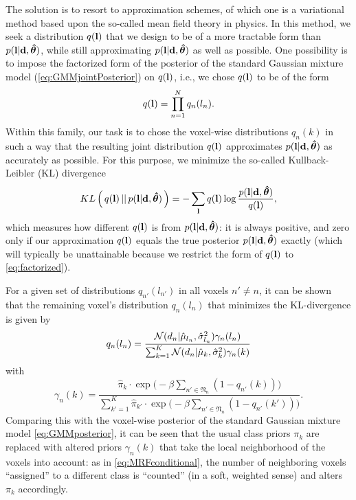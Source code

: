 \documentclass[10pt,twoside]{book}
\begin{document}
The solution is to resort to approximation schemes, of which one is a variational method based upon the so-called mean field theory in physics. In this method, we seek a distribution $q(\mathbf{l})$ that we design to be of a more tractable form than $p(\mathbf{l} | \mathbf{d}, {\mbox{\boldmath {${\hat{\theta}}$}}})$, while still approximating $p(\mathbf{l} | \mathbf{d}, {\mbox{\boldmath {${\hat{\theta}}$}}})$ as well as possible. One possibility is to impose the factorized form of the posterior of the standard Gaussian mixture model (\eqref{eq:GMMjointPosterior}) on $q(\mathbf{l})$, i.e., we chose $q(\mathbf{l})$ to be of the form
\begin{equation}
  q( \mathbf{l} ) = \prod_{n=1}^N q_n( l_n ).
  \label{eq:factorized}
\end{equation}
Within this family, our task is to chose the voxel-wise distributions $q_n(k)$ in such a way that the resulting joint distribution $q(\mathbf{l})$ approximates $p(\mathbf{l} | \mathbf{d}, {\mbox{\boldmath {${\hat{\theta}}$}}})$ as accurately as possible. For this purpose, we minimize the so-called Kullback-Leibler (KL) divergence
\begin{equation}
  {KL}\left( \, q( \mathbf{l} ) \, || \, p(\mathbf{l} | \mathbf{d}, {\mbox{\boldmath {${\hat{\theta}}$}}}) \, \right) = - \sum_{\mathbf{l}} q( \mathbf{l} ) \log \frac{ p(\mathbf{l} | \mathbf{d}, {\mbox{\boldmath {${\hat{\theta}}$}}}) }{ q( \mathbf{l} ) },
  \label{eq:KL}
\end{equation}
which measures how different $q( \mathbf{l} )$ is from $p(\mathbf{l} | \mathbf{d}, {\mbox{\boldmath {${\hat{\theta}}$}}})$: it is always positive, and zero only if our approximation $q( \mathbf{l} )$ equals the true posterior $p(\mathbf{l} | \mathbf{d}, {\mbox{\boldmath {${\hat{\theta}}$}}})$ exactly (which will typically be unattainable because we restrict the form of $q( \mathbf{l} )$ to \eqref{eq:factorized}).

For a given set of distributions $q_{n'}( l_{n'} )$ in all voxels $n' \neq n$, it can be shown~\cite{Jaakkola} that the remaining voxel's distribution $q_n( l_n )$ that minimizes the KL-divergence is given by
\begin{equation}
  q_n( l_n ) = \frac{ \N( d_n | \hat{\mu}_{l_n}, \hat{\sigma}_{l_n}^2 ) \gamma_n(l_n) }%
                                              { \sum_{k=1}^K \N( d_n | \hat{\mu}_k, \hat{\sigma}_k^2 ) \gamma_n( k ) }
  \label{eq:meanfield}
\end{equation}
with
\begin{equation}
  \gamma_n(k) = 
  \frac{ \hat{\pi}_{k} \cdot \exp\big( -\beta \sum_{n' \in \mathfrak{N}_n} ( 1 - q_{n'}( k ) ) \big) }%
       { \sum_{k'=1}^K \hat{\pi}_{k'} \cdot \exp\big( -\beta \sum_{n' \in \mathfrak{N}_n} ( 1 - q_{n'}( k' ) ) \big) }.
  \label{eq:meanfieldPrior}
\end{equation}
Comparing this with the voxel-wise posterior of the standard Gaussian mixture model \eqref{eq:GMMposterior}, it can be seen that the usual class priors $\pi_k$ are replaced with altered priors $\gamma_n(k)$ that take the local neighborhood of the voxels into account: as in \eqref{eq:MRFconditional}, the number of neighboring voxels ``assigned'' to a different class is ``counted'' (in a soft, weighted sense) and alters $\pi_k$ accordingly.
\end{document}
